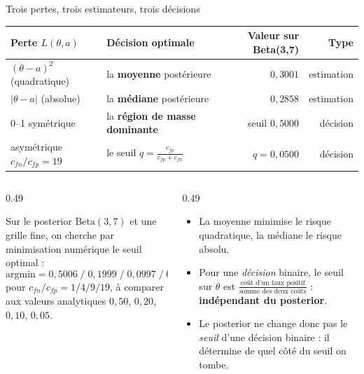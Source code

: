 \begin{frame}{Trois pertes, trois estimateurs, trois décisions}
\begin{center}
\small
\begin{tabular}{@{}p{3.4cm}p{4.2cm}rr@{}}
\toprule
\textbf{Perte} $L(\theta,a)$ & \textbf{Décision optimale} & \textbf{Valeur sur Beta}(3,7) & \textbf{Type} \\
\midrule
$(\theta - a)^2$ (quadratique) & la \textbf{moyenne} postérieure & $0{,}3001$ & estimation \\
$|\theta - a|$ (absolue) & la \textbf{médiane} postérieure & $0{,}2858$ & estimation \\
0--1 symétrique & la \textbf{région de masse dominante} & seuil $0{,}5000$ & décision \\
asymétrique $c_{fn}/c_{fp} = 19$ & le seuil $q = \frac{c_{fp}}{c_{fp}+c_{fn}}$ & $q = 0{,}0500$ & décision \\
\bottomrule
\end{tabular}
\end{center}
\vspace{1mm}
\begin{columns}[t]
\begin{column}{0.49\textwidth}
\begin{ebox}
Sur le posterior $\mathrm{Beta}(3,7)$ et une grille fine, on cherche par
minimisation numérique le seuil optimal :
\[
\text{argmin} = 0{,}5006 \; / \; 0{,}1999 \; / \; 0{,}0997 \; / \; 0{,}0502
\]
pour $c_{fn}/c_{fp} = 1 / 4 / 9 / 19$, à comparer aux valeurs analytiques
$0{,}50$, $0{,}20$, $0{,}10$, $0{,}05$. \ok
\end{ebox}
\end{column}
\begin{column}{0.49\textwidth}
\begin{kbox}
\begin{itemize}
  \item La moyenne minimise le risque quadratique, la médiane le risque absolu.
  \item Pour une \emph{décision} binaire, le seuil sur $\theta$ est
        $\frac{\text{coût d'un faux positif}}{\text{somme des deux coûts}}$ :
        \textbf{indépendant du posterior}.
  \item Le posterior ne change donc pas le \emph{seuil} d'une décision binaire :
        il détermine de quel côté du seuil on tombe.
\end{itemize}
\end{kbox}
\end{column}
\end{columns}
\end{frame}

